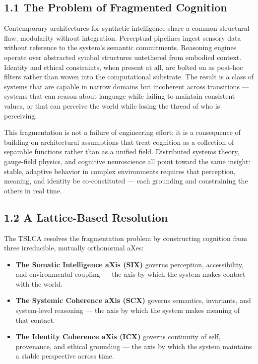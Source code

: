 \subsection{1.1 The Problem of Fragmented Cognition}\label{the-problem-of-fragmented-cognition}

Contemporary architectures for synthetic intelligence share a common structural flaw: modularity without integration. Perceptual pipelines ingest sensory data without reference to the system's semantic commitments. Reasoning engines operate over abstracted symbol structures untethered from embodied context. Identity and ethical constraints, when present at all, are bolted on as post-hoc filters rather than woven into the computational substrate. The result is a class of systems that are capable in narrow domains but incoherent across transitions --- systems that can reason about language while failing to maintain consistent values, or that can perceive the world while losing the thread of who is perceiving.

This fragmentation is not a failure of engineering effort; it is a consequence of building on architectural assumptions that treat cognition as a collection of separable functions rather than as a unified field. Distributed systems theory, gauge-field physics, and cognitive neuroscience all point toward the same insight: stable, adaptive behavior in complex environments requires that perception, meaning, and identity be co-constituted --- each grounding and constraining the others in real time.

\subsection{1.2 A Lattice-Based Resolution}\label{a-lattice-based-resolution}

The TSLCA resolves the fragmentation problem by constructing cognition from three irreducible, mutually orthonormal aXes:

\begin{itemize}
\tightlist
\item
  \textbf{The Somatic Intelligence aXis (SIX)} governs perception, accessibility, and environmental coupling --- the axis by which the system makes contact with the world.
\item
  \textbf{The Systemic Coherence aXis (SCX)} governs semantics, invariants, and system-level reasoning --- the axis by which the system makes meaning of that contact.
\item
  \textbf{The Identity Coherence aXis (ICX)} governs continuity of self, provenance, and ethical grounding --- the axis by which the system maintains a stable perspective across time.
\end{itemize}

